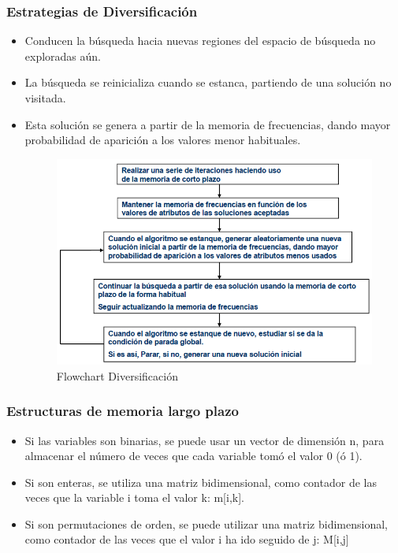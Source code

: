 \documentclass{llncs}
\begin{document}
\subsubsection{Estrategias de Diversificaci\'{o}n}
\begin{itemize}
\item Conducen la b\'{u}squeda hacia nuevas regiones del espacio de b\'{u}squeda no exploradas a\'{u}n.
\item La b\'{u}squeda se reinicializa cuando se estanca, partiendo de una soluci\'{o}n no visitada.
\item Esta soluci\'{o}n se genera a partir de la memoria de frecuencias, dando mayor probabilidad de aparici\'{o}n a los valores menor habituales.


\begin{figure}[h]
\centering
\includegraphics[scale=0.9]{img/diversificacion.png}
\caption{Flowchart Diversificaci\'{o}n}
\end{figure}
\end{itemize}

\subsubsection{Estructuras de memoria largo plazo}
\begin{itemize}
\item Si las variables son binarias, se puede usar un vector de dimensi\'{o}n n, para almacenar el n\'{u}mero de veces que cada variable tom\'{o} el valor 0 (\'{o} 1).
\item Si son enteras, se utiliza una matriz bidimensional, como contador de las veces que la variable i toma el valor k: m[i,k].
\item Si son permutaciones de orden, se puede utilizar una matriz bidimensional, como contador de las veces que el valor i ha ido seguido de j: M[i,j]
\end{itemize}
\end{document}
